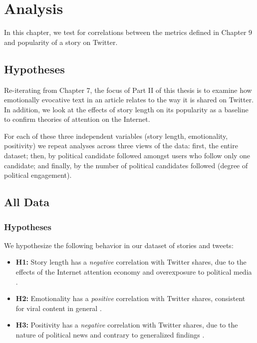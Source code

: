 
\chapter{Analysis}
In this chapter, we test for correlations between the metrics defined in Chapter 9 and popularity of a story on Twitter.

\section{Hypotheses}
Re-iterating from Chapter 7, the focus of Part II of this thesis is to examine how emotionally evocative text in an article relates to the way it is shared on Twitter. In addition, we look at the effects of story length on its popularity as a baseline to confirm theories of attention on the Internet.

For each of these three independent variables (story length, emotionality, positivity) we repeat analyses across three views of the data: first, the entire dataset; then, by political candidate followed amongst users who follow only one candidate; and finally, by the number of political candidates followed (degree of political engagement).




\section{All Data}
\subsection{Hypotheses}
We hypothesize the following behavior in our dataset of stories and tweets:

\begin{itemize} 
    \item \textbf{H1:} Story length has a \emph{negative} correlation with Twitter shares, due to the effects of the Internet attention economy and overexposure to political media \cite{goldhaber1997attention}.
    \item \textbf{H2:} Emotionality has a \emph{positive} correlation with Twitter shares, consistent for viral content in general \cite{berger2012makes}.
    \item \textbf{H3:} Positivity has a \emph{negative} correlation with Twitter shares, due to the nature of political news and contrary to generalized findings \cite{berger2012makes}.

\end{itemize}

